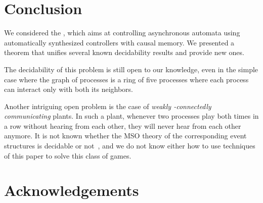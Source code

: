 \documentclass[a4paper,UKenglish]{lipics-v2016}
\begin{document}
\section*{Conclusion}
We considered the \dsp,
which aims at controlling asynchronous automata
using automatically 
synthesized controllers with causal memory.
We presented a theorem that unifies several known decidability results and provide new ones.

The decidability of this problem is still open to our knowledge, even in the simple case where the graph of processes is a ring of five processes where each process can interact only with both its  neighbors.

Another intriguing open problem is the case of \emph{weakly -connectedly communicating} plants.
In such a plant, whenever two processes play both  times in a row without hearing from each other,
they will never hear from each other anymore. 
It is not known whether the MSO theory of
the corresponding event structures is decidable or not~\cite{madhu},
and we do not know either how to use techniques of this paper to solve this class of games.

\section*{Acknowledgements}
\end{document}
